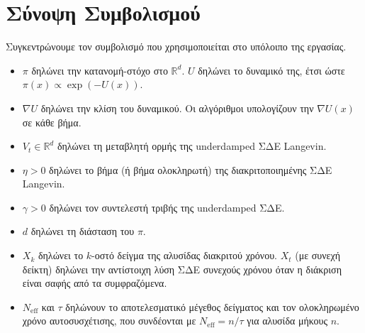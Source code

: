 \newpage
\section{Σύνοψη Συμβολισμού}
\label{sec:bg-notation}

Συγκεντρώνουμε τον συμβολισμό που χρησιμοποιείται στο υπόλοιπο της εργασίας.

\begin{itemize}
  \item $\pi$ δηλώνει την κατανομή-στόχο στο $\mathbb{R}^d$.
        $U$ δηλώνει το δυναμικό της, έτσι ώστε $\pi(x) \propto \exp(-U(x))$.
  \item $\nabla U$ δηλώνει την κλίση του δυναμικού. Οι αλγόριθμοι υπολογίζουν
        την $\nabla U(x)$ σε κάθε βήμα.
  \item $V_t \in \mathbb{R}^d$ δηλώνει τη μεταβλητή ορμής της underdamped ΣΔΕ
        Langevin.
  \item $\eta > 0$ δηλώνει το βήμα (ή βήμα ολοκληρωτή) της διακριτοποιημένης
        ΣΔΕ Langevin.
  \item $\gamma > 0$ δηλώνει τον συντελεστή τριβής της underdamped ΣΔΕ.
  \item $d$ δηλώνει τη διάσταση του $\pi$.
  \item $X_k$ δηλώνει το $k$-οστό δείγμα της αλυσίδας διακριτού χρόνου.
        $X_t$ (με συνεχή δείκτη) δηλώνει την αντίστοιχη λύση ΣΔΕ συνεχούς
        χρόνου όταν η διάκριση είναι σαφής από τα συμφραζόμενα.
  \item $N_\mathrm{eff}$ και $\tau$ δηλώνουν το αποτελεσματικό μέγεθος
        δείγματος και τον ολοκληρωμένο χρόνο αυτοσυσχέτισης, που συνδέονται
        με $N_\mathrm{eff} = n / \tau$ για αλυσίδα μήκους $n$.
\end{itemize}
